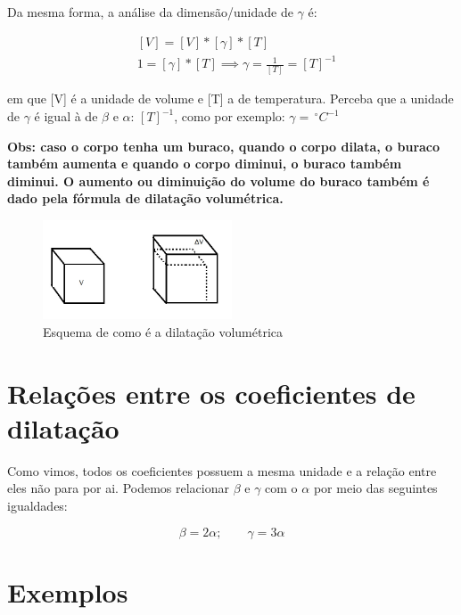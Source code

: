\documentclass[12pt]{extarticle}
\newcommand{\<}{\langle}
\renewcommand{\>}{\rangle}
\theoremstyle{definition}
\begin{document}
Da mesma forma, a análise da dimensão/unidade de $\gamma$ é:

\begin{equation}
    \begin{split}
        &[V] = [V]*[\gamma]*[T]\\
        &1 = [\gamma]*[T] \implies \gamma= \frac{1}{[T]} = [T]^{-1}
    \end{split}
\end{equation}

\noindent em que [V] é a unidade de volume e [T] a de temperatura. Perceba que a unidade de $\gamma$ é igual à de $\beta$ e $\alpha$: $[T]^{-1}$, como por exemplo: $\gamma =\, ^\circ C^{-1}$

\textbf{Obs: caso o corpo tenha um buraco, quando o corpo dilata, o buraco também aumenta e quando o corpo diminui, o buraco também diminui. O aumento ou diminuição do volume do buraco também é dado pela fórmula de dilatação volumétrica.}

\begin{figure}[H]
    \centering
    \includegraphics[width=0.5\textwidth]{aaed6390a9a14e9897c7dc8056a1ceff-xd5g0w (1).jpg}
    \caption{Esquema de como é a dilatação volumétrica}
    \label{fig:dilatacao_vol}
\end{figure}

\section{Relações entre os coeficientes de dilatação}

Como vimos, todos os coeficientes possuem a mesma unidade e a relação entre eles não para por ai. Podemos relacionar $\beta$ e $\gamma$ com o $\alpha$ por meio das seguintes igualdades:

\begin{equation}
    \boxed{\beta = 2\alpha;\quad\quad \gamma = 3\alpha}
\end{equation}

\section{Exemplos}
\end{document}
